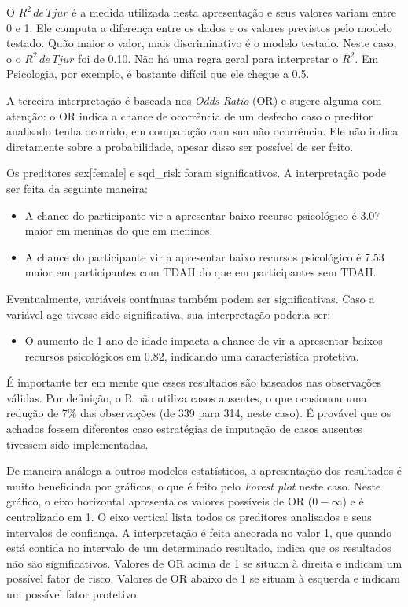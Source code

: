 \documentclass[
]{book}
\providecommand{\tightlist}{%
  \setlength{\itemsep}{0pt}\setlength{\parskip}{0pt}}
\begin{document}
O \(R^2 \, de \, Tjur\) é a medida utilizada nesta apresentação e seus
valores variam entre 0 e 1. Ele computa a diferença entre os dados e os
valores previstos pelo modelo testado. Quão maior o valor, mais
discriminativo é o modelo testado. Neste caso, o o \(R^2 \, de \, Tjur\)
foi de 0.10. Não há uma regra geral para interpretar o \(R^2\). Em
Psicologia, por exemplo, é bastante difícil que ele chegue a 0.5.

A terceira interpretação é baseada nos \emph{Odds Ratio} (OR) e sugere
alguma com atenção: o OR indica a chance de ocorrência de um desfecho
caso o preditor analisado tenha ocorrido, em comparação com sua não
ocorrência. Ele não indica diretamente sobre a probabilidade, apesar
disso ser possível de ser feito.

Os preditores sex{[}female{]} e sqd\_risk foram significativos. A
interpretação pode ser feita da seguinte maneira:

\begin{itemize}
\tightlist
\item
  A chance do participante vir a apresentar baixo recurso psicológico é
  3.07 maior em meninas do que em meninos.
\item
  A chance do participante vir a apresentar baixo recursos psicológico é
  7.53 maior em participantes com TDAH do que em participantes sem TDAH.
\end{itemize}

Eventualmente, variáveis contínuas também podem ser significativas. Caso
a variável age tivesse sido significativa, sua interpretação poderia
ser:

\begin{itemize}
\tightlist
\item
  O aumento de 1 ano de idade impacta a chance de vir a apresentar
  baixos recursos psicológicos em 0.82, indicando uma característica
  protetiva.
\end{itemize}

É importante ter em mente que esses resultados são baseados nas
observações válidas. Por definição, o R não utiliza casos ausentes, o
que ocasionou uma redução de 7\% das observações (de 339 para 314, neste
caso). É provável que os achados fossem diferentes caso estratégias de
imputação de casos ausentes tivessem sido implementadas.

De maneira análoga a outros modelos estatísticos, a apresentação dos
resultados é muito beneficiada por gráficos, o que é feito pelo
\emph{Forest plot} neste caso. Neste gráfico, o eixo horizontal
apresenta os valores possíveis de OR (\(0-\infty\)) e é centralizado em
1. O eixo vertical lista todos os preditores analisados e seus
intervalos de confiança. A interpretação é feita ancorada no valor 1,
que quando está contida no intervalo de um determinado resultado, indica
que os resultados não são significativos. Valores de OR acima de 1 se
situam à direita e indicam um possível fator de risco. Valores de OR
abaixo de 1 se situam à esquerda e indicam um possível fator protetivo.
\end{document}
